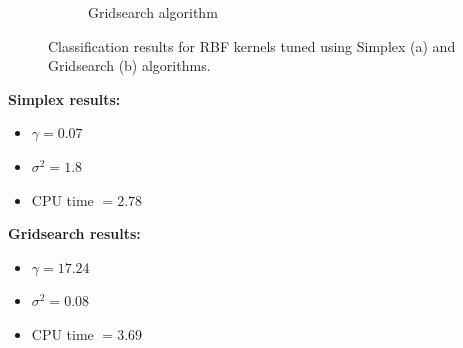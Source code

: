 \documentclass{article}
\begin{document}
\begin{figure}[h]
\begin{subfigure}[b]{0.4\textwidth}
                    \caption{Gridsearch algorithm}
                     \label{fig:rbf_gridsearch_tuned}
                 \end{subfigure}
                 \hspace{0.05\textwidth}
                \caption{Classification results for RBF kernels tuned using Simplex (a) and Gridsearch (b) algorithms.}
            \end{figure}
        
            \textbf{Simplex results:}
            \begin{itemize}
                \item $\gamma = 0.07$
                \item $\sigma^2 = 1.8$
                \item CPU time $= 2.78$
            \end{itemize}
            \textbf{Gridsearch results:}
            \begin{itemize}
                \item $\gamma = 17.24$
                \item $\sigma^2 = 0.08$
                \item CPU time $= 3.69$
            \end{itemize}
            
\end{document}
